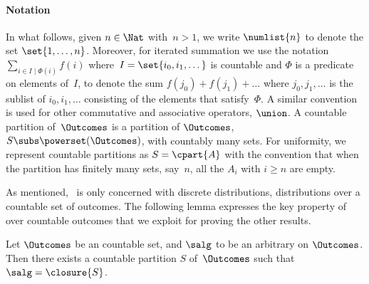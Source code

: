 \documentclass[acmsmall,nonacm,screen,appendix]{acmart}
\begin{document}
\paragraph{Notation}
In what follows,
given $n\in\Nat$ with~$n> 1$,
we write $\numlist{n}$
to denote the set $\set{1, \dots, n}$.
Moreover, for iterated summation we use the
notation
$
  \sum_{i \in I \mid \Phi(i)} f(i)
$
where~$I = \set{i_0, i_1, \dots}$ is countable
and $\Phi$ is a predicate on elements of~$I$,
to denote the sum $ f(j_0) + f(j_1) + \dots $
where $j_0, j_1, \dots$ is the sublist of $ i_0, i_1, \dots $ consisting
of the elements that satisfy~$\Phi$.
A similar convention is used for other commutative and associative operators,
\eg $\union$.
A countable partition of~$\Outcomes$ is a partition of $\Outcomes$,
$S \subs \powerset(\Outcomes)$,
with countably many sets.
For uniformity, we represent countable partitions as $S = \cpart{A}$
with the convention that when the partition has finitely many sets,
say~$n$, all the $A_i$ with $i \geq n$ are empty.

As mentioned, \thelogic\ is only concerned with discrete distributions,
\ie distributions over a countable set of outcomes.
The following lemma expresses the key property of \salgebra[s]
over countable outcomes that we exploit for proving the
other results.

\begin{lemma}
  \label{thm:countable-partition-generated}
 Let $\Outcomes$ be an countable set, and $\salg$ to be an arbitrary \salgebra{}
  on $\Outcomes$. Then there exists a countable partition $S$ of~$\Outcomes$
  such that $\salg = \closure{S}$.
\end{lemma}
\end{document}
